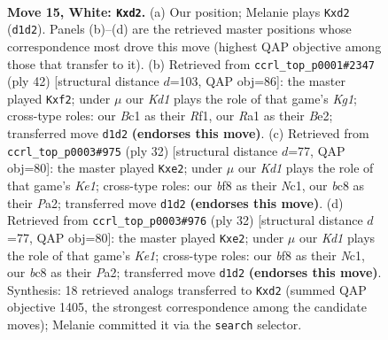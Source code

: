 \documentclass[11pt]{article}
\begin{document}
\clearpage

\begin{figure}[p]\centering
\begin{subfigure}{0.46\textwidth}\centering
\resizebox{\linewidth}{!}{%
\newchessgame
\chessboard[
  setfen={r1b1kb1r/pp1n1p2/4p3/3pP1Pp/8/8/PP1q2PP/R1BK1NNR w kq - 0 15},
  showmover=false,
  pgfstyle=straightmove, color=movearrow, markmove={d1-d2}
]}
\caption{}
\end{subfigure}\hfill
\begin{subfigure}{0.46\textwidth}\centering
\resizebox{\linewidth}{!}{%
\newchessgame
\chessboard[
  setfen={r3r1n1/1pp2p1k/p3b1pp/8/4PP2/2N5/PP2BqPP/R4RK1 w - - 0 22},
  showmover=false,
  pgfstyle=straightmove, color=movearrow, markmove={g1-f2}
]}
\caption{}
\end{subfigure}
\\[4pt]
\begin{subfigure}{0.46\textwidth}\centering
\resizebox{\linewidth}{!}{%
\newchessgame
\chessboard[
  setfen={4kb1r/pp1n1ppp/8/1P2pb2/8/4N3/PB1PqPPP/2N1K2R w Kk - 0 17},
  showmover=false,
  pgfstyle=straightmove, color=movearrow, markmove={e1-e2}
]}
\caption{}
\end{subfigure}\hfill
\begin{subfigure}{0.46\textwidth}\centering
\resizebox{\linewidth}{!}{%
\newchessgame
\chessboard[
  setfen={4kb1r/pp1n1ppp/8/1P2pb2/8/4N3/PB1PqPPP/2N1K2R w Kk - 0 17},
  showmover=false,
  pgfstyle=straightmove, color=movearrow, markmove={e1-e2}
]}
\caption{}
\end{subfigure}
\caption{\textbf{Move 15, White: \texttt{Kxd2}.} (a) Our position; Melanie plays \texttt{Kxd2} (\texttt{d1d2}). Panels (b)--(d) are the retrieved master positions whose correspondence most drove this move (highest QAP objective among those that transfer to it). (b) Retrieved from \texttt{ccrl\_top\_p0001\#2347} (ply 42) [structural distance $d$=103, QAP obj=86]: the master played \texttt{Kxf2}; under $\mu$ our \emph{Kd1} plays the role of that game's \emph{Kg1}; cross-type roles: our \emph{B}c1 as their \emph{R}f1, our \emph{R}a1 as their \emph{B}e2; transferred move \texttt{d1d2} \textbf{(endorses this move)}. (c) Retrieved from \texttt{ccrl\_top\_p0003\#975} (ply 32) [structural distance $d$=77, QAP obj=80]: the master played \texttt{Kxe2}; under $\mu$ our \emph{Kd1} plays the role of that game's \emph{Ke1}; cross-type roles: our \emph{b}f8 as their \emph{N}c1, our \emph{b}c8 as their \emph{P}a2; transferred move \texttt{d1d2} \textbf{(endorses this move)}. (d) Retrieved from \texttt{ccrl\_top\_p0003\#976} (ply 32) [structural distance $d$=77, QAP obj=80]: the master played \texttt{Kxe2}; under $\mu$ our \emph{Kd1} plays the role of that game's \emph{Ke1}; cross-type roles: our \emph{b}f8 as their \emph{N}c1, our \emph{b}c8 as their \emph{P}a2; transferred move \texttt{d1d2} \textbf{(endorses this move)}. Synthesis: 18 retrieved analogs transferred to \texttt{Kxd2} (summed QAP objective 1405, the strongest correspondence among the candidate moves); Melanie committed it via the \texttt{search} selector.}
\label{fig:thought-m28}
\end{figure}
\end{document}
